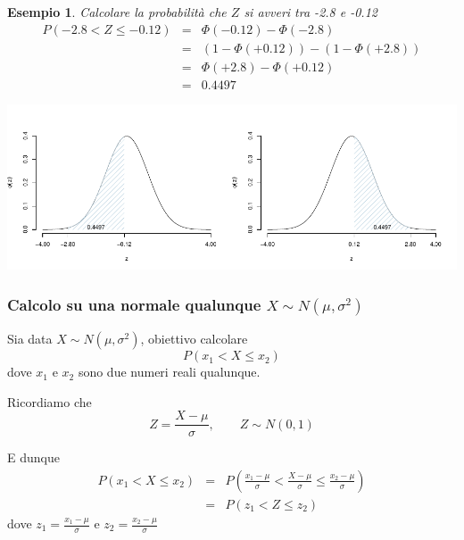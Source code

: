 \documentclass[
  11pt,
]{book}
\theoremstyle{mytheoremstyle}
\theoremstyle{mydefstyle}
\newtheorem{example}{{Esempio}}[section]
\begin{document}
\begin{example}

Calcolare la probabilità che \(Z\) si avveri tra -2.8 e -0.12
\begin{eqnarray*}
P(-2.8< Z \leq -0.12) &=& \Phi(-0.12)-\Phi(-2.8) \\
                         &=& (1-\Phi(+0.12))-(1-\Phi(+2.8)) \\
                         &=& \Phi(+2.8)-\Phi(+0.12)\\
                         &=& 0.4497
\end{eqnarray*}

\begin{center}\includegraphics{Appunti_di_Statistica_2025_files/figure-latex/07c-Normale-25-1} \end{center}

\end{example}

\subsubsection{\texorpdfstring{Calcolo su una normale qualunque \(X\sim N(\mu,\sigma^2)\)}{Calcolo su una normale qualunque X\textbackslash sim N(\textbackslash mu,\textbackslash sigma\^{}2)}}\label{calcolo-su-una-normale-qualunque-xsim-nmusigma2}

Sia data \(X\sim N(\mu,\sigma^2)\), obiettivo calcolare
\[P(x_1<X\leq x_2)\]
dove \(x_1\) e \(x_2\) sono due numeri reali qualunque.

Ricordiamo che
\[Z=\frac {X-\mu}\sigma,\qquad Z\sim N(0,1)\]

E dunque
\begin{eqnarray*}
P(x_1<X\leq x_2) &=& P\left( \frac {x_1 - \mu}\sigma < \frac {X - \mu}\sigma \leq \frac {x_2 - \mu}\sigma\right) \\
                  &=& P(z_1<Z\leq z_2)  
\end{eqnarray*}
dove \(z_1=\frac {x_1 - \mu}\sigma\) e \(z_2=\frac {x_2 - \mu}\sigma\)
\end{document}
